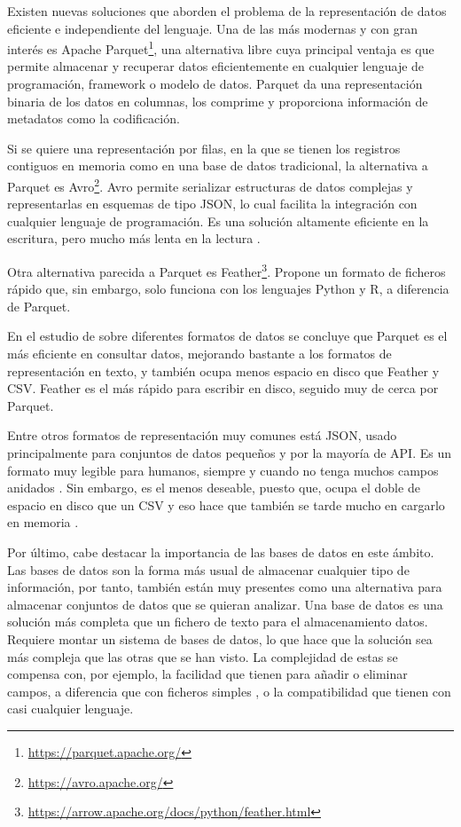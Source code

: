 Existen nuevas soluciones que aborden el problema de la representación de datos
eficiente e independiente del lenguaje. Una de las más modernas y con gran
interés es Apache Parquet\footnote{\url{https://parquet.apache.org/}}, una
alternativa libre cuya principal ventaja es que permite almacenar y recuperar
datos eficientemente en cualquier lenguaje de programación, framework o modelo
de datos. Parquet da una representación binaria de los datos en columnas, los
comprime y proporciona información de metadatos como la codificación.

Si se quiere una representación por filas, en la que se tienen los registros
contiguos en memoria como en una base de datos tradicional, la alternativa a
Parquet es Avro\footnote{\url{https://avro.apache.org/}}. Avro permite
serializar estructuras de datos complejas y representarlas en esquemas de tipo
JSON, lo cual facilita la integración con cualquier lenguaje de programación. Es
una solución altamente eficiente en la escritura, pero mucho más lenta en la
lectura \cite{ramos_big_2023}.

Otra alternativa parecida a Parquet es
Feather\footnote{\url{https://arrow.apache.org/docs/python/feather.html}}.
Propone un formato de ficheros rápido que, sin embargo, solo funciona con los
lenguajes Python y R, a diferencia de Parquet.

En el estudio de \cite{murallie_csvs_2022} sobre diferentes formatos de datos se
concluye que Parquet es el más eficiente en consultar datos, mejorando bastante
a los formatos de representación en texto, y también ocupa menos espacio en
disco que Feather y CSV. Feather es el más rápido para escribir en disco,
seguido muy de cerca por Parquet. 

Entre otros formatos de representación muy comunes está JSON, usado
principalmente para conjuntos de datos pequeños y por la mayoría de API. Es un
formato muy legible para humanos, siempre y cuando no tenga muchos campos
anidados \cite{ramos_big_2023}. Sin embargo, es el menos deseable, puesto que,
ocupa el doble de espacio en disco que un CSV y eso hace que también se tarde
mucho en cargarlo en memoria \cite{murallie_csvs_2022}.

Por último, cabe destacar la importancia de las bases de datos en este ámbito.
Las bases de datos son la forma más usual de almacenar cualquier tipo de
información, por tanto, también están muy presentes como una alternativa para
almacenar conjuntos de datos que se quieran analizar. Una base de datos es una
solución más completa que un fichero de texto para el almacenamiento datos.
Requiere montar un sistema de bases de datos, lo que hace que la solución sea
más compleja que las otras que se han visto. La complejidad de estas se compensa
con, por ejemplo, la facilidad que tienen para añadir o eliminar campos, a
diferencia que con ficheros simples \cite{ramos_big_2023}, o la compatibilidad
que tienen con casi cualquier lenguaje.

